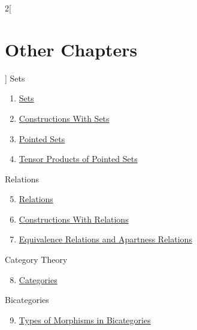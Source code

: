 \begin{multicols}{2}[\section{Other Chapters}]
\noindent
Sets
\begin{enumerate}
\item \hyperref[sets:section-phantom]{Sets}
\item \hyperref[constructions-with-sets:section-phantom]{Constructions With Sets}
\item \hyperref[pointed-sets:section-phantom]{Pointed Sets}
\item \hyperref[tensor-products-of-pointed-sets:section-phantom]{Tensor Products of Pointed Sets}
\end{enumerate}
Relations
\begin{enumerate}
\setcounter{enumi}{4}
\item \hyperref[relations:section-phantom]{Relations}
\item \hyperref[constructions-with-relations:section-phantom]{Constructions With Relations}
\item \hyperref[equivalence-relations-and-apartness-relations:section-phantom]{Equivalence Relations and Apartness Relations}
\end{enumerate}
Category Theory
\begin{enumerate}
\setcounter{enumi}{7}
\item \hyperref[categories:section-phantom]{Categories}
\end{enumerate}
Bicategories
\begin{enumerate}
\setcounter{enumi}{8}
\item \hyperref[types-of-morphisms-in-bicategories:section-phantom]{Types of Morphisms in Bicategories}
\end{enumerate}
\end{multicols}
